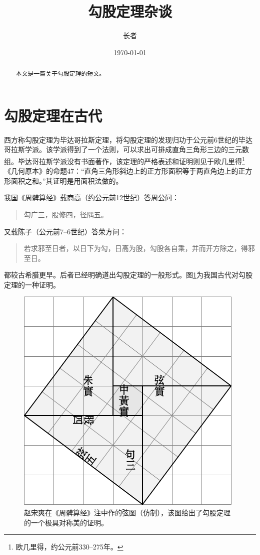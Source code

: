 \documentclass[UTF8]{ctexart}
\title{\heiti 勾股定理杂谈}
\author{\kaishu 长者}
\date{\today}
\newenvironment{myquote}
  {\begin{quote}\kaishu\zihao{-5}}
  {\end{quote}}
\begin{document}
\maketitle

\begin{abstract}
本文是一篇关于勾股定理的短文。
\end{abstract}

\tableofcontents

\section{勾股定理在古代}
\label{sec:ancient}
西方称勾股定理为毕达哥拉斯定理，将勾股定理的发现归功于公元前6世纪的毕达哥拉斯学派\cite{Kline}。该学派得到了一个法则，可以求出可排成直角三角形三边的三元数组。毕达哥拉斯学派没有书面著作，该定理的严格表述和证明则见于欧几里得\footnote{欧几里得，约公元前330--275年。}《几何原本》的命题47：“直角三角形斜边上的正方形面积等于两直角边上的正方形面积之和。”其证明是用面积法做的。

我国《周髀算经》载商高（约公元前12世纪）答周公问：

\begin{myquote}
\kaishu
勾广三，股修四，径隅五。
\end{myquote}
又载陈子（公元前7--6世纪）答荣方问：

\begin{myquote}
\kaishu
若求邪至日者，以日下为勾，日高为股，勾股各自乘，并而开方除之，得邪至日。
\end{myquote}
都较古希腊更早。后者已经明确道出勾股定理的一般形式。图\ref{fig:xiantu}为我国古代对勾股定理的一种证明\cite{quanjing}。

\begin{figure}[ht]
	\centering
	\includegraphics[scale=0.6]{xiantu.pdf}
	\caption{赵宋爽在《周髀算经》注中作的弦图（仿制），该图给出了勾股定理的一个极具对称美的证明。}
	\label{fig:xiantu}
\end{figure}
\end{document}
